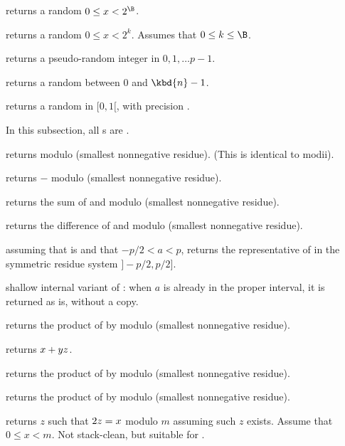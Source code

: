  returns a random $0 \leq x < 2^\B$.

 returns a random $0 \leq x < 2^k$. Assumes
that $0 \leq k \leq \B$.

 returns a pseudo-random integer
in $0, 1, \dots p-1$.

 returns a random  between $0$ and $\kbd{n}
- 1$.

 returns a random  in $[0,1[$, with
precision .

 In this subsection, all s are
.

 returns  modulo  (smallest
nonnegative residue). (This is identical to modii).

 returns $-$ modulo  (smallest
nonnegative residue).

 returns the sum of  and
 modulo  (smallest nonnegative residue).

 returns the difference of  and
 modulo  (smallest nonnegative residue).

 assuming that  is
 and that $-p/2 < a < p$, returns the representative of
 in the symmetric residue system $]-p/2,p/2]$.

 shallow internal variant of
: when $a$ is already in the
proper interval, it is returned as is, without a copy.

 returns the product of  by
 modulo  (smallest nonnegative residue).

 returns $x + y\*z$.

 returns the product of  by
 modulo  (smallest nonnegative residue).

 returns the product of  by
 modulo  (smallest nonnegative residue).

 returns $z$ such that $2\*z = x$ modulo
$m$ assuming such $z$ exists. Assume that $0 \leq x < m$. Not stack-clean,
but suitable for .


